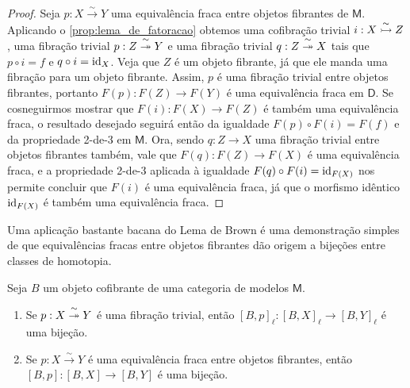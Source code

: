 \begin{proof}
  Seja $p: X \overset{\sim}{\to} Y$ uma equivalência fraca entre objetos fibrantes de $\mathsf{M}$.
  Aplicando o \cref{prop:lema_de_fatoracao} obtemos uma cofibração trivial $i: X \overset{\sim}{\rightarrowtail} Z$, uma fibração trivial $p: Z \overset{\sim}{\twoheadrightarrow} Y$ e uma fibração trivial $q: Z \overset{\sim}{\twoheadrightarrow} X$ tais que $p \circ i = f$ e $q \circ i = \mathrm{id}_{X}$.
  Veja que $Z$ é um objeto fibrante, já que ele manda uma fibração para um objeto fibrante.
  Assim, $p$ é uma fibração trivial entre objetos fibrantes, portanto $F(p): F(Z) \to F(Y)$ é uma equivalência fraca em $\mathsf{D}$.
  Se cosneguirmos mostrar que $F(i): F(X) \to F(Z)$ é também uma equivalência fraca, o resultado desejado seguirá então da igualdade $F(p) \circ F(i) = F(f)$ e da propriedade 2-de-3 em $\mathsf{M}$.
  Ora, sendo $q: Z \to X$ uma fibração trivial entre objetos fibrantes também, vale que $F(q): F(Z) \to F(X)$ é uma equivalência fraca, e a propriedade 2-de-3 aplicada à igualdade $F(q) \circ F(i) = \mathrm{id}_{F(X)}$ nos permite concluir que $F(i)$ é uma equivalência fraca, já que o morfismo idêntico $\mathrm{id}_{F(X)}$ é também uma equivalência fraca.
\end{proof}

Uma aplicação bastante bacana do Lema de Brown é uma demonstração simples de que equivalências fracas entre objetos fibrantes dão origem a bijeções entre classes de homotopia.

\begin{prop}
  Seja $B$ um objeto cofibrante de uma categoria de modelos $\mathsf{M}$.
  \begin{enumerate}
  \item Se $p: X \overset{\sim}{\twoheadrightarrow} Y$ é uma fibração trivial, então $[B,p]_{\ell}: [B,X]_{\ell} \to [B,Y]_{\ell}$ é uma bijeção.
    
  \item Se $p: X \overset{\sim}{\to} Y$ é uma equivalência fraca entre objetos fibrantes, então $[B,p]: [B,X] \to [B,Y]$ é uma bijeção.
  \end{enumerate}
\end{prop}

